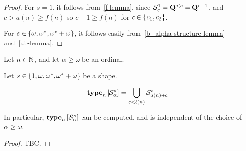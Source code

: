 \begin{proof}
    For $s = 1$, it follows from~\cref{f-lemma},
    since $\mathcal{S}^{1}_{c} = \mathbf{Q}^{< c} = \mathbf{Q}^{c-1}$.
    and $c > a(n) \ge f(n)$ so $c-1 \ge f(n)$ for $c \in \left\{ {c_1, c_2} \right\}$.

    For $s \in \left\{ {\omega, \omega^\ast, \omega^\ast + \omega} \right\}$, it follows easily from~\cref{b_alpha-structure-lemma}
    and~\cref{ab-lemma}.
\end{proof}

\begin{lemma}
    Let $n \in \mathbb{N}$, and let $\alpha \ge \omega$ be an ordinal.

    Let $s \in \left\{ {1, \omega, \omega^\ast, \omega^\ast + \omega} \right\}$ be a shape.

    \[\mathbf{type}_{n} \left[ {\mathcal{S}^{s}_{\alpha}} \right] = \bigcup_{c < b(n)}{\mathcal{S}^{s}_{a(n) + c}                                                                                                                                                                                                                                                                                                                                                                                                                                       }\]

    In particular, $\mathbf{type}_{n} \left[ {\mathcal{S}^{s}_{\alpha}} \right]$ can be
    computed, and is independent of the choice of $\alpha \ge \omega$.
\end{lemma}

\begin{proof}
    TBC.

\end{proof}